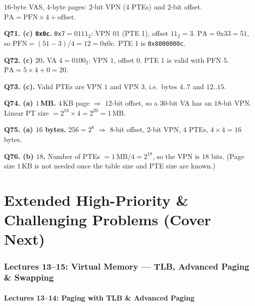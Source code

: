\documentclass[11pt,a4paper]{article}
\newenvironment{Sol}{%
  \begin{tcolorbox}[sboxstyle, title={Solution}]%
}{%
  \end{tcolorbox}\vspace{0.35em}%
}
\begin{document}
\begin{Sol}
$16$-byte VAS, $4$-byte pages: $2$-bit VPN (4 PTEs) and $2$-bit
offset. $\mathrm{PA}=\mathrm{PFN}\times 4+\mathrm{offset}$.

\textbf{Q71. (c) \texttt{0x0c}.}
\texttt{0x7}$=0111_2$: VPN $01$ (PTE 1), offset $11_2=3$.
$\mathrm{PA}=0\mathrm{x}33=51$, so
$\mathrm{PFN}=(51-3)/4=12=0\mathrm{x}0\mathrm{c}$.
PTE 1 is \texttt{0x8000000c}.

\textbf{Q72. (c) $20$.}
VA $4=0100_2$: VPN $1$, offset $0$. PTE 1 is valid with PFN $5$.
$\mathrm{PA}=5\times 4+0=20$.

\textbf{Q73. (c).}
Valid PTEs are VPN $1$ and VPN $3$, i.e.\ bytes $4..7$ and
$12..15$.

\textbf{Q74. (a) $1$\,MB.}
$4$\,KB page $\Rightarrow$ $12$-bit offset, so a $30$-bit VA has an
$18$-bit VPN. Linear PT size
$=2^{18}\times 4=2^{20}=1$\,MB.

\textbf{Q75. (a) $16$ bytes.}
$256=2^8$ $\Rightarrow$ $8$-bit offset, $2$-bit VPN, $4$ PTEs,
$4\times 4=16$ bytes.

\textbf{Q76. (b) $18$.}
Number of PTEs $=1\,\mathrm{MB}/4=2^{18}$, so the VPN is $18$ bits.
(Page size $1$\,KB is not needed once the table size and PTE size are
known.)
\end{Sol}

\clearpage

\part{Extended High-Priority \& Challenging Problems (Cover Next)}

\section{Lectures 13--15: Virtual Memory --- TLB, Advanced Paging \& Swapping}

\subsection{Lectures 13--14: Paging with TLB \& Advanced Paging}
\end{document}
